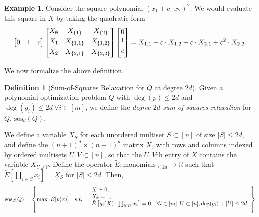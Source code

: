 \documentclass[a4paper,11pt]{article}
\newcommand{\R}{\mathbb{R}}
\newcommand{\sos}{\mathrm{sos}}
\theoremstyle{definition}
\newtheorem{example}{Example}
\newtheorem{definition}{Definition}
\begin{document}
\begin{example}
Consider the square polynomial $(x_1 + c \cdot x_2)^2$.
We would evaluate this square in $X$ by taking the quadratic form
\[
\begin{bmatrix}
0 & 1 & c
\end{bmatrix}
\begin{bmatrix}
\vspace{1mm}
 X_{\emptyset} & X_{\{1\}} & X_{\{2\}} \\
\vspace{1mm}
 X_{1} & X_{\{1,1\}} & X_{\{1,2\}} \\
\vspace{1mm}
 X_{2} & X_{\{2,1\}} & X_{\{2,2\}}\\
\end{bmatrix}
\begin{bmatrix}
0\\
\vspace{1mm}
1 \\
\vspace{1mm}
c
\end{bmatrix}
= X_{1,1} + c\cdot X_{1,2} + c\cdot X_{2,1} + c^2 \cdot X_{2,2}.
\]
\end{example}

\medskip
We now formalize the above definition.
\begin{definition}[Sum-of-Squares Relaxation for $Q$ at degree $2d$]
Given a polynomial optimization problem $Q$ with $\deg(p)\le 2d$ and $\deg(g_i) \le 2d\ \forall i \in [m]$, we define the {\em degree-$2d$ sum-of-squares relaxation} for $Q$, $\sos_{d}(Q)$.

We define a variable $X_{S}$ for each unordered multiset $S \subset [n]$ of size $|S| \le 2d$, and define the $(n+1)^d \times (n+1)^d$ matrix $X$, with rows and columns indexed by ordered multisets $U,V \subset [n]$, so that the $U,V$th entry of $X$ contains the variable $X_{U\cup V}$.
Define the operator $\tilde{E}:\text{monomials}_{\le 2d}\to \R$ such that $\tilde{E}[\prod_{i\in S} x_i] = X_S$ for $|S| \le 2d$.
Then,
\[
\sos_d(Q) =
\left\{
\max \ \tilde{E}[p(x)] \quad s.t.\quad
\begin{blockarray}{l}
 X \succeq 0,&\\
X_{\emptyset} = 1,& \\
\tilde{E}\left[ g_i(X)\cdot\prod_{i\in U} x_i\right] = 0\quad  \forall i \in [m], U \subset [n], \deg(g_i) + |U| \le 2d&
\end{blockarray}
\right\}
\]
\end{definition}
\end{document}
